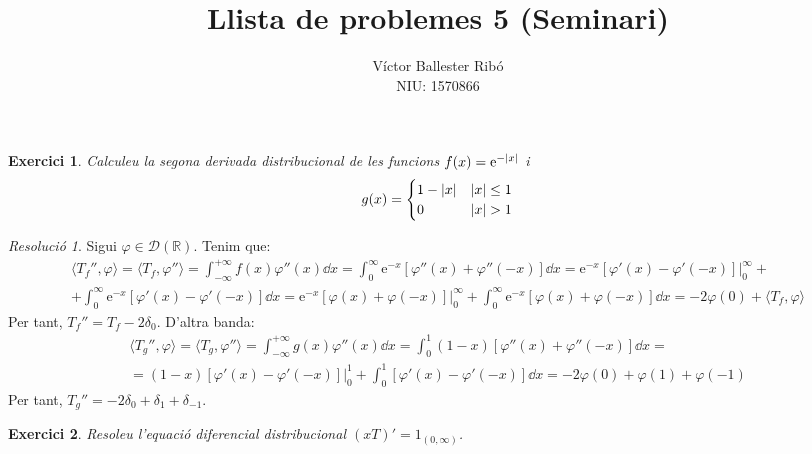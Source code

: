 \documentclass[10pt,a4paper]{article}
\title{\bfseries\Large Llista de problemes 5 (Seminari)}
\author{Víctor Ballester Ribó\\NIU: 1570866}
\date{\parbox{\linewidth}{\centering
  Anàlisi Harmònica\endgraf
  Grau en Matemàtiques\endgraf
  Universitat Autònoma de Barcelona\endgraf
  Abril de 2023}}
\newcommand{\RR}{\ensuremath{\mathbb{R}}} %
\newcommand{\vf}[1]{\boldsymbol{\mathrm{#1}}} %
\newtheorem{exercici}{Exercici}
\theoremstyle{definition}
\theoremstyle{remark}
\newtheorem*{res}{Resolució}
\renewcommand{\exp}[1]{\mathrm{e}^{#1}} %
\begin{document}
\maketitle
\begin{exercici}
  Calculeu la segona derivada distribucional de les funcions $f(x)=\exp{-\abs{x}}$ i
  $$
    g(x)=\begin{cases}
      1-\abs{x} & \abs{x}\leq 1 \\
      0         & \abs{x}>1
    \end{cases}
  $$
\end{exercici}
\begin{res}
  Sigui $\varphi\in\mathcal{D}(\RR)$. Tenim que:
  \begin{multline*}
    \langle T_f'',\varphi\rangle = \langle T_f,\varphi''\rangle=\int_{-\infty}^{+\infty}f(x)\varphi''(x) \dd{x}=\int_{0}^{\infty}\exp{-x}[\varphi''(x) +\varphi''(-x)] \dd{x}=\exp{-x}[\varphi'(x) -\varphi'(-x)]\Big|_0^\infty+\\+\int_{0}^{\infty}\exp{-x}[\varphi'(x) -\varphi'(-x)] \dd{x}=\exp{-x}[\varphi(x) +\varphi(-x)]\Big|_0^\infty+\int_{0}^{\infty}\exp{-x}[\varphi(x) +\varphi(-x)] \dd{x}=-2\varphi(0)+\langle T_f,\varphi\rangle
  \end{multline*}
  Per tant, $T_f''=T_f-2\delta_0$. D'altra banda:
  \begin{multline*}
    \langle T_g'',\varphi\rangle = \langle T_g,\varphi''\rangle=\int_{-\infty}^{+\infty}g(x)\varphi''(x) \dd{x}=\int_{0}^{1}(1-x)[\varphi''(x)+\varphi''(-x)] \dd{x}=\\=(1-x)[\varphi'(x)-\varphi'(-x)]\Big|_0^{1}+\int_{0}^{1}[\varphi'(x)-\varphi'(-x)] \dd{x}=-2\varphi(0)+\varphi(1) +\varphi(-1)
  \end{multline*}
  Per tant, $T_g''=-2\delta_0+\delta_1+\delta_{-1}$.
\end{res}
\begin{exercici}
  Resoleu l'equació diferencial distribucional ${(xT)}'=\vf{1}_{(0,\infty)}$.
\end{exercici}
\end{document}
